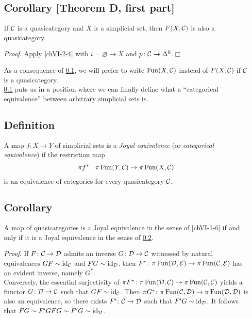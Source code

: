     \subsection{Corollary [Theorem D, first part]}\label{chVI-2-8}
        If $\mathcal{C}$ is a quasicategory and $X$ is a simplicial set, then $F(X, \mathcal{C})$ is also a quasicategory.
        \smallskip

        \emph{Proof}. Apply \ref{chVI-2-4} with $i = \varnothing \to X$ and $p \colon \mathcal{C} \to \Delta^0$.\hfill$\Box$
        \medskip

        As a consequence of \ref{chVI-2-8}, we will prefer to write $\operatorname{Fun}(X, \mathcal{C})$ instead of $F(X, \mathcal{C})$ if $\mathcal{C}$ is a quasicategory.\\
        \ref{chVI-2-8} puts us in a position where we can finally define what a ``categorical equivalence'' between arbitrary simplicial sets is.

    \subsection{Definition}\label{chVI-2-9}
        A map $f \colon X \to Y$ of simplicial sets is a \emph{Joyal equivalence} (or \emph{categorical equivalence}) if the restriction map
        \begin{equation*}
            \pi f^{*} \,\colon \pi \operatorname{Fun}(Y, \mathcal{C}) \to \pi \operatorname{Fun}(X, \mathcal{C})
        \end{equation*}
        is an equivalence of categories for every quasicategory $\mathcal{C}$.

    \subsection{Corollary}\label{chVI-2-10}
        A map of quasicategories is a Joyal equivalence in the sense of \ref{chVI-1-6} if and only if it is a Joyal equivalence in the sense of \ref{chVI-2-9}.
        \smallskip

        \emph{Proof}. If $F \colon \mathcal{C} \to \mathcal{D}$ admits an inverse $G \colon \mathcal{D} \to \mathcal{C}$ witnessed by natural equivalences $GF \sim \operatorname{id}_{\mathcal{C}}$ and $FG \sim \operatorname{id}_{\mathcal{D}}$, then $F^{*} \colon \pi \operatorname{Fun}(\mathcal{D}, \mathcal{E}) \to \pi \operatorname{Fun}(\mathcal{C}, \mathcal{E})$ has an evident inverse, namely $G^{*}$.\\
        Conversely, the essential surjectivity of $\pi F^{*} \colon \pi \operatorname{Fun}(\mathcal{D}, \mathcal{C}) \to \pi \operatorname{Fun}(\mathcal{C}, \mathcal{C})$ yields a functor $G \colon \mathcal{D} \to \mathcal{C}$ such that $GF \sim \operatorname{id}_{\mathcal{C}}$. Then $\pi G^{*} \colon \pi \operatorname{Fun}(\mathcal{C}, \mathcal{D}) \to \pi \operatorname{Fun}(\mathcal{D}, \mathcal{D})$ is also an equivalence, so there exists $F' \colon \mathcal{C} \to \mathcal{D}$ such that $F'G \sim \operatorname{id}_{\mathcal{D}}$. It follows that $FG \sim F'GFG \sim F'G \sim \operatorname{id}_{\mathcal{D}}$.

